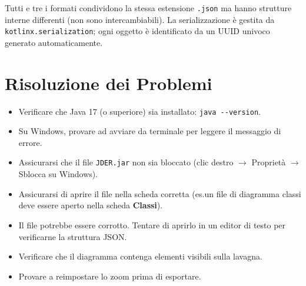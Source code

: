 \documentclass[a4paper,11pt]{article}
\newcommand{\uielement}[1]{\textbf{#1}}
\begin{document}
Tutti e tre i formati condividono la stessa estensione \texttt{.json} ma hanno strutture interne
differenti (non sono intercambiabili). La serializzazione è gestita da \texttt{kotlinx.serialization};
ogni oggetto è identificato da un UUID univoco generato automaticamente.

\section{Risoluzione dei Problemi}
\label{sec:troubleshooting}

\begin{tcolorbox}[warnbox, title={L'applicazione non si avvia}]
  \begin{itemize}
    \item Verificare che Java 17 (o superiore) sia installato: \texttt{java -{}-version}.
    \item Su Windows, provare ad avviare da terminale per leggere il messaggio di errore.
    \item Assicurarsi che il file \texttt{JDER.jar} non sia bloccato (clic destro
          $\to$ Proprietà $\to$ Sblocca su Windows).
  \end{itemize}
\end{tcolorbox}

\begin{tcolorbox}[warnbox, title={Il file salvato non si apre}]
  \begin{itemize}
    \item Assicurarsi di aprire il file nella scheda corretta (es.\@ un file di diagramma classi
          deve essere aperto nella scheda \uielement{Classi}).
    \item Il file potrebbe essere corrotto. Tentare di aprirlo in un editor di testo
          per verificarne la struttura JSON.
  \end{itemize}
\end{tcolorbox}

\begin{tcolorbox}[warnbox, title={L'esportazione PNG è vuota o incompleta}]
  \begin{itemize}
    \item Verificare che il diagramma contenga elementi visibili sulla lavagna.
    \item Provare a reimpostare lo zoom prima di esportare.
  \end{itemize}
\end{tcolorbox}
\end{document}
